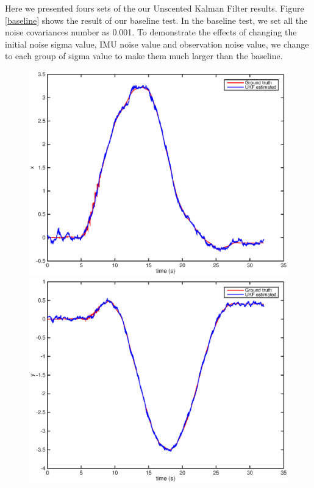 \documentclass[letter, 10pt]{article}
\begin{document}
\begin{onehalfspacing}
Here we presented fours sets of the our Unscented Kalman Filter results. Figure \ref{baseline} shows the result of our baseline test. In the baseline test, we set all the noise covariances number as 0.001. To demonstrate the effects of changing the initial noise sigma value, IMU noise value and observation noise value, we change to each group of sigma value to make them much larger than the baseline. 
\begin{figure}[h]
	\centering
	\begin{minipage}{.25\textwidth} 
  		\centering
    		\includegraphics[width=1\linewidth]{b_x.eps}
	\end{minipage}%
	\begin{minipage}{.25\textwidth} 
		\centering
    		\includegraphics[width=1\linewidth]{b_y.eps}

\end{minipage}
\end{figure}
\end{onehalfspacing}
\end{document}
